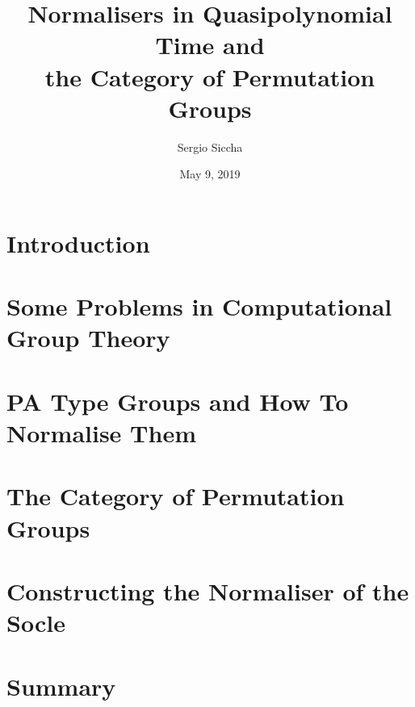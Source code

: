\documentclass{beamer}
\title{Normalisers in Quasipolynomial Time and \\
the Category of Permutation Groups}
\date{May 9, 2019}
\author{Sergio Siccha}
\institute{Lehrstuhl B f\"ur Mathematik, RWTH Aachen}
\theoremstyle{plain}
\theoremstyle{definition}
\begin{document}
\maketitle
\section{Introduction}


\section{Some Problems in Computational Group Theory}


\section{PA Type Groups and How To Normalise Them}


\section{The Category of Permutation Groups}


\section{Constructing the Normaliser of the Socle}


\section{Summary}

\end{document}
